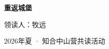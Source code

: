 \documentclass[12pt,a4paper]{article}
\begin{document}
\thispagestyle{empty}

\vspace*{6cm}

\begin{center}
{\Huge\bfseries 重返城堡}

\vspace{2.5cm}

{\large 领读人：牧远}

\vspace{1em}

{\large 2026年夏 · 知合中山营共读活动}

\end{center}
\end{document}
